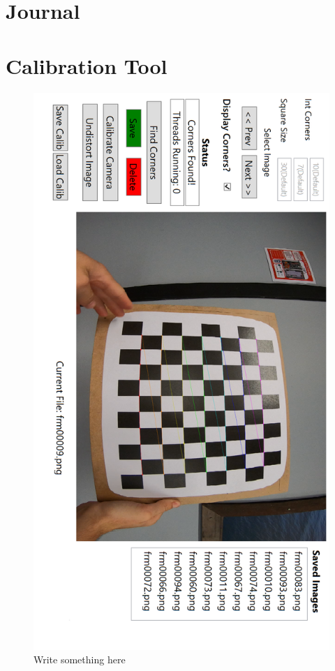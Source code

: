 \documentclass{UoNMCHA}
\numberwithin{equation}{section}
\begin{document}
\newpage


\appendix
\newpage
\section{Journal}\label{app:Journal}
\newpage
\section{Calibration Tool}\label{app:calibrationTool}
\begin{figure}[ht]
    \begin{center}
        \includegraphics[width=.6\linewidth]{Figures/Calibration_Tool}
        \caption{Write something here}
        \label{fig:Calibration_Tool}
    \end{center}
\end{figure}
\end{document}
